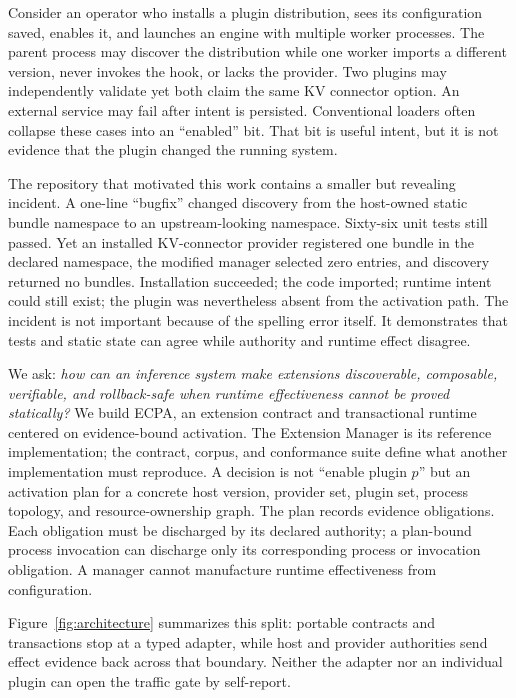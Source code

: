 \documentclass[letterpaper,twocolumn,10pt]{article}
\newcommand{\system}{\textsc{ECPA}\xspace}
\begin{document}
Consider an operator who installs a plugin distribution, sees its configuration
saved, enables it, and launches an engine with multiple worker processes.  The
parent process may discover the distribution while one worker imports a
different version, never invokes the hook, or lacks the provider.  Two plugins
may independently validate yet both claim the same KV connector option.  An
external service may fail after intent is persisted.  Conventional loaders
often collapse these cases into an ``enabled'' bit.  That bit is useful intent,
but it is not evidence that the plugin changed the running system.

The repository that motivated this work contains a smaller but revealing
incident.  A one-line ``bugfix'' changed discovery from the host-owned static
bundle namespace to an upstream-looking namespace.  Sixty-six unit tests still
passed.  Yet an installed KV-connector provider registered one bundle in the
declared namespace, the modified manager selected zero entries, and discovery
returned no bundles.
Installation succeeded; the code imported; runtime intent could still exist;
the plugin was nevertheless absent from the activation path.  The incident is
not important because of the spelling error itself.  It demonstrates that
tests and static state can agree while authority and runtime effect disagree.

We ask: \emph{how can an inference system make extensions discoverable,
composable, verifiable, and rollback-safe when runtime effectiveness cannot be
proved statically?}  We build \system, an extension contract and transactional
runtime centered on evidence-bound activation.  The Extension Manager is its
reference implementation; the contract, corpus, and conformance suite define
what another implementation must reproduce.  A decision is not ``enable plugin $p$'' but an activation plan
for a concrete host version, provider set, plugin set, process topology, and
resource-ownership graph.  The plan records evidence obligations.  Each
obligation must be discharged by its declared authority; a plan-bound process
invocation can discharge only its corresponding process or invocation
obligation.  A manager cannot manufacture runtime effectiveness from
configuration.

Figure~\ref{fig:architecture} summarizes this split: portable contracts and
transactions stop at a typed adapter, while host and provider authorities send
effect evidence back across that boundary.  Neither the adapter nor an
individual plugin can open the traffic gate by self-report.
\end{document}
